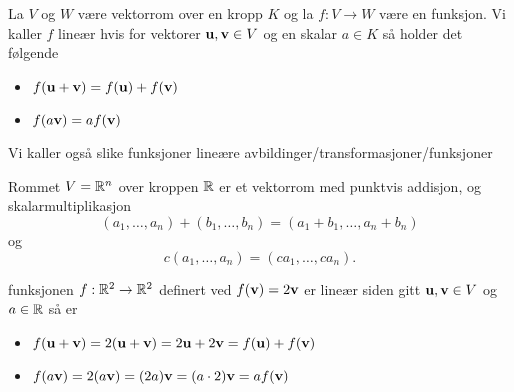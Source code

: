 \begin{definisjon}\label{Def:LinAvb}
    La $V$ og $W$ være vektorrom over en kropp $K$ og la $f: V\to W$ være en funksjon. Vi kaller $f$ lineær hvis
for vektorer $\textbf{u},\textbf{v}\in V$ og en skalar $a\in K$ så holder det følgende
    \begin{itemize}
    \item $f(\textbf{u}+\textbf{v}) = f(\textbf{u})+f(\textbf{v})$
    \item $f(a\textbf{v}) = af(\textbf{v})$
    \end{itemize}
    Vi kaller også slike funksjoner lineære avbildinger/transformasjoner/funksjoner
\end{definisjon}

\begin{eksempel}\label{Ex:EukVRom}
    Rommet $V = \mathbb{R}^n$ over kroppen $\mathbb{R}$ er et vektorrom med punktvis addisjon, og skalarmultiplikasjon
    \[(a_1,\dots,a_n)+(b_1,\dots,b_n) = (a_1+b_1,\dots,a_n+b_n)\]
    og
    \[c(a_1,\dots,a_n)=(ca_1,\dots,ca_n).\]
\end{eksempel}

\begin{eksempel}\label{Ex:label}
    funksjonen $f:\mathbb{R}^2\to\mathbb{R}^2$ definert ved $f(\textbf{v}) = 2\textbf{v}$ er lineær siden gitt $\textbf{u},\textbf{v}\in V$
og $a\in\mathbb{R}$ så er
    \begin{itemize}
        \item $f(\textbf{u}+\textbf{v}) = 2(\textbf{u}+\textbf{v}) = 2\textbf{u}+2\textbf{v} = f(\textbf{u})+f(\textbf{v})$
        \item $f(a\textbf{v}) = 2(a\textbf{v}) = (2a)\textbf{v} = (a\cdot2)\textbf{v} = af(\textbf{v})$
    \end{itemize}
\end{eksempel}
